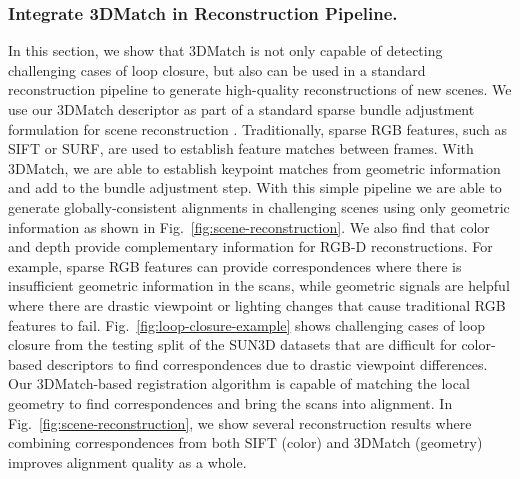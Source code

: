 \documentclass[10pt,twocolumn,letterpaper]{article}
\begin{document}
\subsubsection{Integrate 3DMatch in Reconstruction Pipeline.}
In this section, we show that 3DMatch is not only capable of detecting challenging cases of loop closure, but also can be used in a standard reconstruction pipeline to generate high-quality reconstructions of new scenes.
We use our 3DMatch descriptor as part of a standard sparse bundle adjustment formulation for scene reconstruction \cite{triggs2000bundle,agarwal2011building}.  Traditionally, sparse RGB features, such as SIFT or SURF, are used to establish feature matches between frames. With 3DMatch, we are able to establish keypoint matches from geometric information and add to the bundle adjustment step. With this simple pipeline we are able to generate globally-consistent alignments in challenging scenes using only geometric information as shown in Fig.~\ref{fig:scene-reconstruction}. 
We also find that color and depth provide complementary information for RGB-D reconstructions. For example, sparse RGB features can provide correspondences where there is insufficient geometric information in the scans, while geometric signals are helpful where there are drastic viewpoint or lighting changes that cause traditional RGB features to fail. 
Fig.~\ref{fig:loop-closure-example} shows challenging cases of loop closure from the testing split of the SUN3D datasets that are difficult for color-based descriptors to find correspondences due to drastic viewpoint differences. Our 3DMatch-based registration algorithm is capable of matching the local geometry to find correspondences and bring the scans into alignment.
In Fig.~\ref{fig:scene-reconstruction}, we show several reconstruction results where combining correspondences from both SIFT (color) and 3DMatch (geometry) improves alignment quality as a whole.




\end{document}

